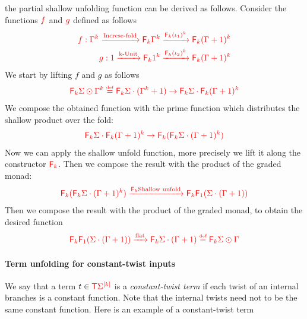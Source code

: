 the partial shallow unfolding function can be derived as follows. Consider the functions ${\color{red}{f}}$ and ${\color{red}{g}}$ defined as follows
\begin{align*}
{\color{red}{f:\Gamma^k \xrightarrow{\text{Increse-fold}} {\color{red}{\mathsf F_{k}}}\Gamma^k \xrightarrow{{\color{red}{\mathsf F_{k}}}(\iota_1)^k} {\color{red}{\mathsf F_{k}}}(\Gamma+1)^k}}  \\ 
{\color{red}{g:1 \xrightarrow{\text{k-Unit}} {\color{red}{\mathsf F_{k}}}1^k \xrightarrow{{\color{red}{\mathsf F_{k}}}(\iota_2)^k} {\color{red}{\mathsf F_{k}}}(\Gamma+1)^k }}
\end{align*}
We start by lifting $f$ and $g$ as follows
\begin{align*}
{\color{red}{{\color{red}{\mathsf F_{k}}}\Sigma \odot \Gamma^k\overset{\text{{\tiny def}}}{=} {\color{red}{\mathsf F_{k}}}\Sigma \cdot (\Gamma^k+1) \to  {\color{red}{\mathsf F_{k}}}\Sigma \cdot {\color{red}{\mathsf F_{k}}}(\Gamma+1)^k}}
\end{align*}
We compose the obtained function with the prime function which distributes   the shallow product over the fold:
\begin{align*}
{\color{red}{{\color{red}{\mathsf F_{k}}}\Sigma \cdot {\color{red}{\mathsf F_{k}}}(\Gamma+1)^k \to {\color{red}{\mathsf F_{k}}}({\color{red}{\mathsf F_{k}}}\Sigma \cdot (\Gamma+1)^k)}}
\end{align*}
Now we can apply the shallow unfold function, more precisely we lift it along the constructor $\reduce k$. Then we compose the result with the product of the graded monad:
\begin{align*}
{\color{red}{{\color{red}{\mathsf F_{k}}}({\color{red}{\mathsf F_{k}}}\Sigma \cdot (\Gamma+1)^k) \xrightarrow{{\color{red}{\mathsf F_{k}}}\text{Shallow unfold}} {\color{red}{\mathsf F_{k}}}{\color{red}{\mathsf F_{1}}}( \Sigma \cdot (\Gamma+1)) }}
\end{align*}
Then we compose the result with the product of the graded monad, to obtain the desired function
\begin{align*}
{\color{red}{{\color{red}{\mathsf F_{k}}}{\color{red}{\mathsf F_{1}}}(\Sigma \cdot (\Gamma+1)) \xrightarrow{{\color{red}{\mathrm{flat}}}} {\color{red}{\mathsf F_{k}}}\Sigma \cdot (\Gamma+1) \overset{\text{{\tiny def}}}{=} {\color{red}{\mathsf F_{k}}}\Sigma \odot \Gamma}}
\end{align*}

\paragraph*{Term unfolding for constant-twist inputs}

We say that a term $ t \in {\color{red}{\mathsf T}} {\color{red}{\Sigma}}^{{\color{red}{[k]}}}$ is a \emph{constant-twist term}  if each twist of an internal branches is a constant function. Note that the internal twists need not to be the same constant function. Here is an example of a constant-twist term

